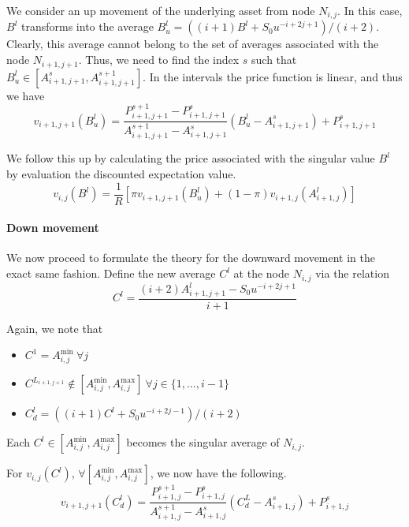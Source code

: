 We consider an up movement of the underlying asset from node $ N_{i,j} $. In this case, $ B^l $ transforms into the average $ B^l_u = \left( (i+1) B^l + S_0 u^{-i+2j+1} \right) / ( i+2 ) $. Clearly, this average cannot belong to the set of averages associated with the node $ N_{i+1,j+1} $. Thus, we need to find the index $s$ such that $ B^l_u \in \left[ A_{i+1,j+1}^{s} , A_{i+1,j+1}^{s+1} \right] $. In the intervals the price function is linear, and thus we have
\begin{equation}
	\label{eq:sp-up-lint}
	v_{i+1,j+1} \left( B^l_u \right) = \frac{ P_{i+1,j+1}^{s+1} - P_{i+1,j+1}^{s} }{ A_{i+1,j+1}^{s+1} - A_{i+1,j+1}^{s} } \left( B^l_u - A_{i+1,j+1}^{s} \right) + P_{i+1,j+1}^{s}
\end{equation}

We follow this up by calculating the price associated with the singular value $ B^l $ by evaluation the discounted expectation value.
\begin{equation}
	\label{eq:sp-up-pr}
	v_{i,j}( B^l ) = \frac{1}{R} \left[ \pi v_{i+1,j+1} \left( B^l_u \right) + (1 - \pi) v_{i+1,j} \left( A_{i+1,j}^l \right) \right]
\end{equation}


\paragraph{Down movement}

We now proceed to formulate the theory for the downward movement in the exact same fashion. Define the new average $ C^l $ at the node $ N_{i,j} $ via the relation
\begin{equation}
	\label{eq:sp-proj-dn}
	C^l = \frac{ ( i+2) A_{i+1,j+1}^l - S_0 u^{-i+2j+1} }{ i+1 }
\end{equation}

Again, we note that
\begin{itemize}
\item $ C^1 = A_{i,j}^{\min} \ \forall j $
\item $ C^{L_{i+1,j+1}} \notin \left[ A_{i,j}^{\min}, A_{i,j}^{\max} \right] \ \forall j \in \{1, \dots, i-1 \} $
\item $ C^l_d = \left( (i+1) C^l + S_0 u^{-i+2j-1} \right) / ( i+2 ) $
\end{itemize}
Each $ C^l \in \left[ A_{i,j}^{\min}, A_{i,j}^{\max} \right] $ becomes the singular average of $ N_{i,j} $.

For $ v_{i,j}( C^l ) $, $ \forall \left[ A_{i,j}^{\min}, A_{i,j}^{\max} \right] $, we now have the following.
\begin{equation}
	\label{eq:sp-dn-lint}
	v_{i+1,j+1} \left( C^l_d \right) = \frac{ P_{i+1,j}^{s+1} - P_{i+1,j}^{s} }{ A_{i+1,j}^{s+1} - A_{i+1,j}^{s} } \left( C^L_d - A_{i+1,j}^{s} \right) + P_{i+1,j}^{s}
\end{equation}

